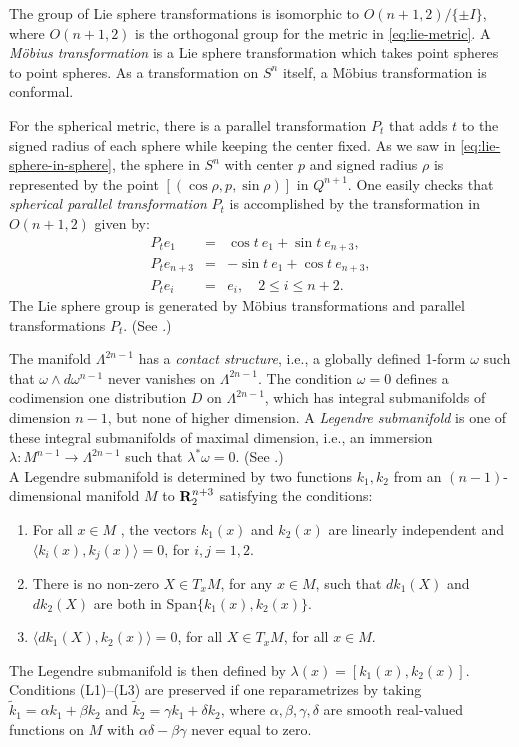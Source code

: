 \documentclass[12pt]{article}
\begin{document}
{The group of Lie sphere transformations is
isomorphic to $O(n+1,2)/ \{ \pm I \}$, where $O(n+1,2)$
is the orthogonal group for the metric in \eqref{eq:lie-metric}.
A {\em M\"{o}bius transformation} is a Lie sphere transformation
which takes point spheres to point spheres.  As a transformation
on $S^n$ itself, a M\"{o}bius transformation is conformal.  


For the spherical metric, there is a parallel transformation $P_t$ that adds $t$ to the signed 
radius of each sphere while keeping the center fixed.  As we saw in \eqref{eq:lie-sphere-in-sphere}, 
the sphere in $S^n$ with center
$p$ and signed radius $\rho$ is represented by the point $[(\cos \rho, p, \sin \rho)]$ in $Q^{n+1}$.
One easily checks that 
{\em spherical parallel transformation}
$P_t$ is accomplished by the 
transformation in $O(n+1,2)$ given by:
\begin{eqnarray}
\label{eq:2.5.3}
P_t e_1 & = & \cos t \ e_1 + \sin t \ e_{n+3}, \nonumber \\
P_t e_{n+3} & = & - \sin t \ e_1 + \cos t \ e_{n+3},\\
P_t e_i & = & e_i, \quad 2 \leq i \leq n+2. \nonumber
\end{eqnarray}
The Lie
sphere group is generated by M\"{o}bius transformations and 
parallel transformations $P_t$.  (See \cite[pp. 25--49]{Cec9}.)

The manifold  $\Lambda ^{2n-1}$ has a {\em contact structure},
i.e., a globally defined 1-form $\omega$ such that
$\omega \wedge d\omega ^{n-1}$ never vanishes on
$\Lambda ^{2n-1}$.  The condition $\omega = 0$ defines a
codimension one distribution $D$ on $\Lambda ^{2n-1}$, which has
integral submanifolds of dimension $n-1$, but none of higher
dimension.  A {\em Legendre submanifold} is one of these integral
submanifolds of maximal dimension, i.e.,
an immersion $\lambda : M^{n-1} \rightarrow
\Lambda ^{2n-1}$ such that $\lambda ^* \omega = 0$. (See \cite[pp. 51--64]{Cec9}.)\\

A Legendre submanifold is determined
by two functions $k_1 , k_2 $ from an $(n-1)$-dimensional
manifold $M$ to
${\bf R}^{n+3}_2$ satisfying the conditions:
\begin{enumerate}
\item[(L1)] For all $x \in M$ , the vectors $k_1 (x)$ and $k_2 (x)$
are linearly independent and 
$\langle k_i (x) , k_j (x) \rangle  = 0$, for $i,j = 1,2$.
\item[(L2)] There is no non-zero $X \in T_x M$, for any $x \in M$,
such that $dk_1 (X)$ and $dk_2 (X)$ are both in Span$\{ k_1 (x),
k_2 (x) \} $.
\item[(L3)] $\langle dk_1 (X), k_2 (x) \rangle = 0$, for all $X \in T_x M$,
for all $x \in M$.\\
\end{enumerate}
The Legendre submanifold is then defined by 
$\lambda (x) = [k_1 (x) , k_2 (x)]$.  Conditions (L1)--(L3) are
preserved if one reparametrizes by taking $\tilde{k} _1 =
\alpha k_1 + \beta k_2 $ and $\tilde{k} _2 = \gamma k_1 +
\delta k_2 $, where $\alpha , \beta , \gamma , \delta$ are smooth
real-valued functions on $M$ with $\alpha \delta -
\beta \gamma$ never equal to zero.

}
\end{document}
